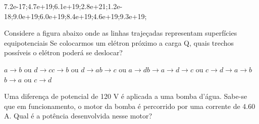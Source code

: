 \documentclass[12pt, addpoints]{exam}
\begin{document}
\begin{questions}
\begin{multicols*}{2}
\begin{oneparchoices}
\choice 7.2e-17;\choice 4.7e+19;\choice 6.1e+19;\choice 2.8e+21;\choice 1.2e-18;\choice 9.0e+19;\choice 6.0e+19;\choice 8.4e+19;\choice 4.6e+19;\choice 9.3e+19;\end{oneparchoices}
\question[20] Considere a figura abaixo onde as linhas trajeçadas representam superfícies equipotenciais Se colocarmos um elétron próximo a carga Q, quais trechos possíveis o elétron poderá se deslocar?
        
        \begin{center}
            \begin{minipage}[c]{0.5\linewidth}
            \end{minipage}
        \end{center}
        
        

\begin{choices}
\choice $a\rightarrow b$ ou $d\rightarrow c$\choice $c\rightarrow b$ ou $d\rightarrow a$\choice $b\rightarrow c$ ou $a\rightarrow d$\choice $b\rightarrow a\rightarrow d\rightarrow c$ ou $c\rightarrow d\rightarrow a\rightarrow b$\choice $b\rightarrow a$ ou $c\rightarrow d$\end{choices}
\question[20] Uma diferença de potencial de 120 V é aplicada a uma bomba d’água. Sabe-se que em funcionamento, o motor da bomba é percorrido por uma corrente de    4.60 A. Qual é a potência desenvolvida nesse motor?


\end{multicols*}
\end{questions}
\end{document}
